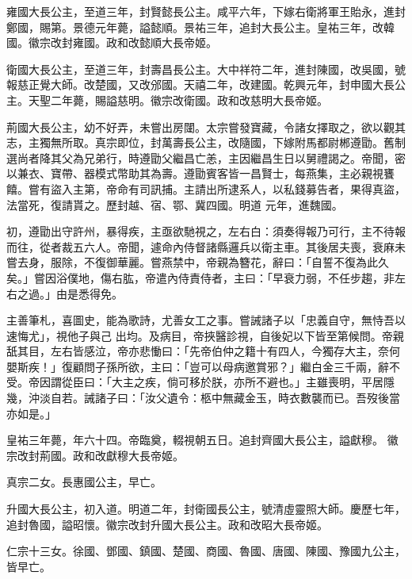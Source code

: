 \begin{pinyinscope}
 雍國大長公主，至道三年，封賢懿長公主。咸平六年，下嫁右衛將軍王貽永，進封鄭國，賜第。景德元年薨，謚懿順。景祐三年，追封大長公主。皇祐三年，改韓國。徽宗改封雍國。政和改懿順大長帝姬。



 衛國大長公主，至道三年，封壽昌長公主。大中祥符二年，進封陳國，改吳國，號報慈正覺大師。改楚國，又改邠國。天禧二年，改建國。乾興元年，封申國大長公主。天聖二年薨，賜謚慈明。徽宗改衛國。政和改慈明大長帝姬。



 荊國大長公主，幼不好弄，未嘗出房闥。太宗嘗發寶藏，令諸女擇取之，欲以觀其志，主獨無所取。真宗即位，封萬壽長公主，改隨國，下嫁附馬都尉郴遵勖。舊制選尚者降其父為兄弟行，時遵勖父繼昌亡恙，主因繼昌生日以舅禮謁之。帝聞，密以兼衣、寶帶、器模式幣助其為壽。遵勖賓客皆一昌賢士，每燕集，主必親視饔饎。嘗有盜入主第，帝命有司訊捕。主請出所逮系人，以私錢募告者，果得真盜，法當死，復請貰之。歷封越、宿、鄂、冀四國。明道
 元年，進魏國。



 初，遵勖出守許州，暴得疾，主亟欲馳視之，左右白：須奏得報乃可行，主不待報而往，從者裁五六人。帝聞，遽命內侍督諸縣邏兵以衛主車。其後居夫喪，衰麻未嘗去身，服除，不復御華麗。嘗燕禁中，帝親為簪花，辭曰：「自誓不復為此久矣。」嘗因浴僕地，傷右肱，帝遣內侍責侍者，主曰：「早衰力弱，不任步趨，非左右之過。」由是悉得免。



 主善筆札，喜圖史，能為歌詩，尤善女工之事。嘗誡諸子以「忠義自守，無恃吾以速悔尤」，視他子與己
 出均。及病目，帝挾醫診視，自後妃以下皆至第候問。帝親舐其目，左右皆感泣，帝亦悲慟曰：「先帝伯仲之籍十有四人，今獨存大主，奈何嬰斯疾！」復顧問子孫所欲，主曰：「豈可以母病邀賞邪？」繼白金三千兩，辭不受。帝因謂從臣曰：「大主之疾，倘可移於朕，亦所不避也。」主雖喪明，平居隱幾，沖淡自若。誡諸子曰：「汝父遺令：柩中無藏金玉，時衣數襲而已。吾歿後當亦如是。」



 皇祐三年薨，年六十四。帝臨奠，輟視朝五日。追封齊國大長公主，謚獻穆。
 徽宗改封荊國。政和改獻穆大長帝姬。



 真宗二女。長惠國公主，早亡。



 升國大長公主，初入道。明道二年，封衛國長公主，號清虛靈照大師。慶歷七年，追封魯國，謚昭懷。徽宗改封升國大長公主。政和改昭大長帝姬。



 仁宗十三女。徐國、鄧國、鎮國、楚國、商國、魯國、唐國、陳國、豫國九公主，皆早亡。




\end{pinyinscope}
